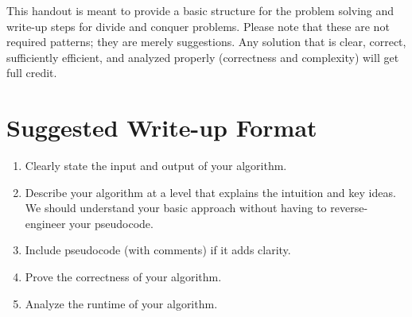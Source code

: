 \documentclass[11pt]{article}
\begin{document}
\noindent
{}

\bigskip
\medskip

\noindent
This handout is meant to provide a basic structure for the problem solving and write-up steps for divide and conquer problems. Please note that these are not required patterns; they are merely suggestions. Any solution that is clear, correct, sufficiently efficient, and analyzed properly (correctness and complexity) will get full credit.

\section{Suggested Write-up Format}
\begin{enumerate}
    \item Clearly state the input and output of your algorithm.
    \item Describe your algorithm at a level that explains the intuition and key ideas. We should understand your basic approach without having to reverse-engineer your pseudocode.
    \item Include pseudocode (with comments) if it adds clarity.
    \item Prove the correctness of your algorithm.
    \item Analyze the runtime of your algorithm.
\end{enumerate}
\end{document}
